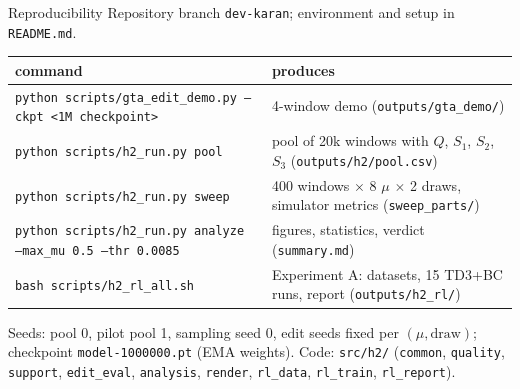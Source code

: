 \documentclass[aspectratio=169,11pt]{beamer}
\begin{document}
\begin{frame}{Reproducibility}
\scriptsize
Repository branch \texttt{dev-karan}; environment and setup in \texttt{README.md}.
\vspace{0.3em}

\begin{tabularx}{\linewidth}{lY}
\toprule
command & produces\\
\midrule
\texttt{python scripts/gta\_edit\_demo.py --ckpt <1M checkpoint>} & 4-window demo (\texttt{outputs/gta\_demo/})\\
\texttt{python scripts/h2\_run.py pool} & pool of 20k windows with $Q$, $S_1$, $S_2$, $S_3$ (\texttt{outputs/h2/pool.csv})\\
\texttt{python scripts/h2\_run.py sweep} & 400 windows $\times$ 8 $\mu$ $\times$ 2 draws, simulator metrics (\texttt{sweep\_parts/})\\
\texttt{python scripts/h2\_run.py analyze --max\_mu 0.5 --thr 0.0085} & figures, statistics, verdict (\texttt{summary.md})\\
\texttt{bash scripts/h2\_rl\_all.sh} & Experiment A: datasets, 15 TD3+BC runs, report (\texttt{outputs/h2\_rl/})\\
\bottomrule
\end{tabularx}
\vspace{0.4em}

Seeds: pool 0, pilot pool 1, sampling seed 0, edit seeds fixed per $(\mu,\text{draw})$; checkpoint \texttt{model-1000000.pt} (EMA weights).
Code: \texttt{src/h2/} (\texttt{common}, \texttt{quality}, \texttt{support}, \texttt{edit\_eval}, \texttt{analysis}, \texttt{render}, \texttt{rl\_data}, \texttt{rl\_train}, \texttt{rl\_report}).
\end{frame}

\appendix
\end{document}
